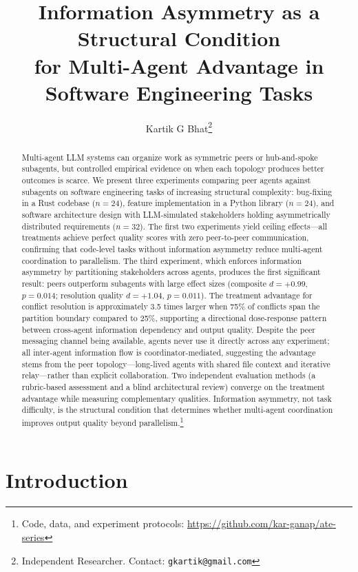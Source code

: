 \documentclass[11pt,letterpaper]{article}
\title{\textbf{Information Asymmetry as a Structural Condition\\[2pt]
  for Multi-Agent Advantage in Software Engineering Tasks}}
\author{Kartik G Bhat\thanks{Independent Researcher. Contact: \texttt{gkartik@gmail.com}}}
\date{}
\newcommand{\pval}[1]{\ensuremath{p = #1}}
\newcommand{\deff}[1]{\ensuremath{d = #1}}
\begin{document}
\maketitle

\begin{abstract}\noindent
Multi-agent LLM systems can organize work as symmetric peers or hub-and-spoke
subagents, but controlled empirical evidence on when each topology produces
better outcomes is scarce. We present three experiments comparing peer agents
against subagents on software engineering tasks of increasing structural
complexity: bug-fixing in a Rust codebase ($n = 24$), feature implementation
in a Python library ($n = 24$), and software architecture design with
LLM-simulated stakeholders holding asymmetrically distributed requirements
($n = 32$). The first two experiments yield ceiling effects---all treatments
achieve perfect quality scores with zero peer-to-peer communication,
confirming that code-level tasks without information asymmetry reduce
multi-agent coordination to parallelism. The third experiment, which
enforces information asymmetry by partitioning stakeholders across agents,
produces the first significant result: peers outperform subagents with
large effect sizes (composite \deff{+0.99}, \pval{0.014}; resolution
quality \deff{+1.04}, \pval{0.011}). The treatment advantage for conflict
resolution is approximately 3.5 times larger when 75\% of conflicts span
the partition boundary compared to 25\%, supporting a directional
dose-response pattern between cross-agent information dependency and
output quality. Despite the peer
messaging channel being available, agents never use it directly across any
experiment; all inter-agent information flow is coordinator-mediated,
suggesting the advantage stems from the peer topology---long-lived agents
with shared file context and iterative relay---rather than explicit
collaboration. Two independent evaluation methods (a rubric-based assessment
and a blind architectural review) converge on the treatment advantage while
measuring complementary qualities. Information asymmetry, not task
difficulty, is the structural condition that determines whether multi-agent
coordination improves output quality beyond parallelism.\footnote{Code, data, and experiment protocols: \url{https://github.com/kar-ganap/ate-series}}
\end{abstract}

\section{Introduction}
\label{sec:intro}
\end{document}
